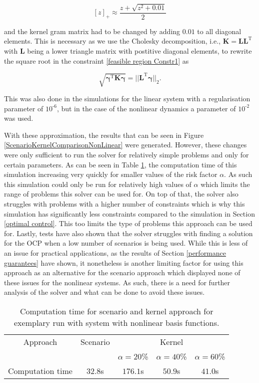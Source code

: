 \begin{equation} \label{max function}
[z]_+ \approx \frac{z + \sqrt{z^2 + 0.01}}{2}
\end{equation}

and the kernel gram matrix had to be changed by adding $0.01$ to all diagonal elements. This is necessary as we use the Cholesky decomposition, i.e., $\boldsymbol{K} = \boldsymbol{L} \boldsymbol{L}^\text{T}$ with $\boldsymbol{L}$ being a lower triangle matrix with postitive diagonal elements, to rewrite the square root in the constraint \eqref{feasible region Constr1} as

\begin{equation} \label{square root}
\sqrt{\boldsymbol{\gamma}^\text{T}\boldsymbol{K}\boldsymbol{\gamma}} = ||\boldsymbol{L}^\text{T} \boldsymbol{\gamma}||_2.
\end{equation}

This was also done in the simulations for the linear system with a regularisation parameter of $10^{\text{-}6}$, but in the case of the nonlinear dynamics a parameter of $10^{\text{-}2}$ was used.

With these approximation, the results that can be seen in Figure \ref{ScenarioKernelComparisonNonLinear} were generated. However, these changes were only sufficient to run the solver for relatively simple problems and only for certain parameters. As can be seen in Table \ref{tab:computation times}, the computation time of this simulation increasing very quickly for smaller values of the risk factor $\alpha$. As such this simulation could only be run for relatively high values of $\alpha$ which limits the range of problems this solver can be used for. On top of that, the solver also struggles with problems with a higher number of constraints which is why this simulation has significantly less constraints compared to the simulation in Section \ref{optimal control}. This too limits the type of problems this approach can be used for. Lastly, tests have also shown that the solver struggles with finding a solution for the OCP when a low number of scenarios is being used. While this is less of an issue for practical applications, as the results of Section \ref{performance guarantees} have shown, it nonetheless is another limiting factor for using this approach as an alternative for the scenario approach which displayed none of these issues for the nonlinear systems. As such, there is a need for further analysis of the solver and what can be done to avoid these issues.


\begin{table}
\centering
\begin{tabular}{|c| c| c| c| c|}
\hline
Approach & Scenario &  \multicolumn{3}{|c|}{Kernel}\\  \cline{3-5} & &  $\alpha = 20$\% & $\alpha = 40$\% & $\alpha = 60$\% \\
\hline
Computation time & $32.8$s & $176.1$s & $50.9$s & $41.0$s\\
\hline
\end{tabular}
\caption{Computation time for scenario and kernel approach for exemplary run with system with nonlinear basis functions.}
\label{tab:computation times}
\end{table} 
